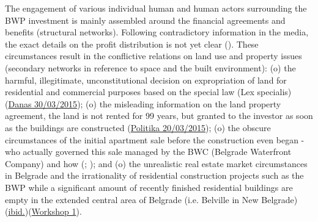\documentclass[11pt]{report}
\begin{document}
{{{{The engagement of various individual human and human actors surrounding the BWP investment is mainly assembled around the financial agreements and benefits (structural networks). Following contradictory information in the media, the exact details on the profit distribution is not yet clear (\href{ref}{\citealt{malenovic_ko_2016}}).
These circumstances result in the conflictive relations on land use and property issues (secondary networks in reference to space and the built environment):
(o) the harmful, illegitimate, unconstitutional decision on expropriation of land for residential and commercial purposes based on the special law (Lex specialis) (\href{Danas}{Danas 30/03/2015});
(o) the misleading information on the land property agreement, the land is not rented for 99 years, but granted to the investor as soon as the buildings are constructed (\href{Politika}{Politika 20/03/2015});
(o) the obscure circumstances of the initial apartment sale before the construction even began - who actually governed this sale managed by the BWC (Belgrade Waterfront Company) and how (\href{ref}{\citealt{lazovic_kako_2015}}; \href{ref}{\citealt{bukvic_ko_2015}});
and
(o) the unrealistic real estate market circumstances in Belgrade and the irrationality of residential construction projects such as the BWP while a significant amount of recently finished residential buildings are empty in the extended central area of Belgrade (i.e. Belville in New Belgrade) (\href{Bukvic}{ibid.})(\href{Expert Workshop}{Workshop 1}).
\\

}}}}
\end{document}
